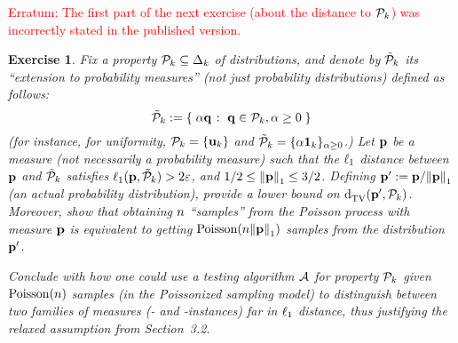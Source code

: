\documentclass[biber]{nowfnt} %
\newtheorem{question}{Exercise}[chapter]
\begin{document}
\noindent \textcolor{red}{Erratum: The first part of the next exercise (about the distance to $\property_\ab$) was incorrectly stated in the published version.}
\begin{question}\label{exo:notrealproba:lb}
Fix a property $\property_\ab \subseteq \distribs{\ab}$ of distributions, and denote by $\tilde{\property}_\ab$ its ``extension to probability measures'' (not just probability distributions) defined as follows:
\begin{equation}
	\tilde{\property}_\ab \eqdef \setOfSuchThat{ \alpha\q }{ \q\in\property_\ab, \alpha \geq 0 }
\end{equation}
(for instance, for uniformity, $\property_\ab=\{\uniformOn{\ab}\}$ and $\tilde{\property}_\ab = \{\alpha \textbf{1}_\ab\}_{\alpha \geq 0}$.) 
Let $\p$ be a measure (not necessarily a probability measure) such that the $\lp[1]$ distance between $\p$ and $\tilde{\property}_\ab$ satisfies $\lp[1](\p,\tilde{\property}_\ab) > 2\dst$, and $1/2\leq \normone{\p} \leq 3/2$. Defining $\p' \eqdef \p/\normone{\p}$ (an actual probability distribution), provide a lower bound on $\totalvardist{\p'}{\property_\ab}$. Moreover, show that obtaining $\ns$ ``samples'' from the Poisson process with measure $\p$ is equivalent to getting $\poisson{\ns\normone{\p}}$ samples from the distribution $\p'$.

Conclude with how one could use a testing algorithm $\Algo$ for property $\property_\ab$ given $\poisson{\ns}$ samples (\ie in the Poissonized sampling model) to distinguish between two families of measures (\yes- and \no-instances) far in $\lp[1]$ distance, thus justifying the relaxed assumption from Section~3.2.
\end{question}
\end{document}
